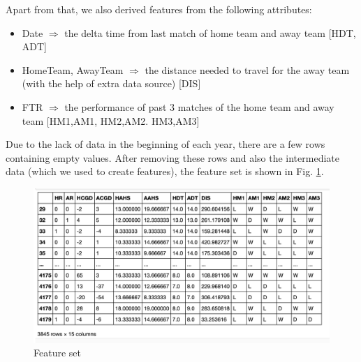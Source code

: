 \documentclass{article}
\begin{document}
Apart from that, we also derived features from the following attributes:
\begin{itemize}
\item Date $\Rightarrow$  the delta time from last match of home team and away team  [HDT, ADT]
\item HomeTeam, AwayTeam $\Rightarrow$  the distance needed to travel for the away team (with the help of extra data source) [DIS]
\item FTR $\Rightarrow$ the performance of past 3 matches of the home team and away team [HM1,AM1, HM2,AM2. HM3,AM3]
\end{itemize}

Due to the lack of data in the beginning of each year, there are a few rows containing empty values. After removing these rows and also the intermediate data (which we used to create features), the feature set is shown in  Fig. \ref{fig:featureSet}.

\begin{figure}[ht]
\centering
\includegraphics[scale=0.5]{graphs/featureSet.png}
\caption{Feature set}
\label{fig:featureSet}
\end{figure}

\end{document}
